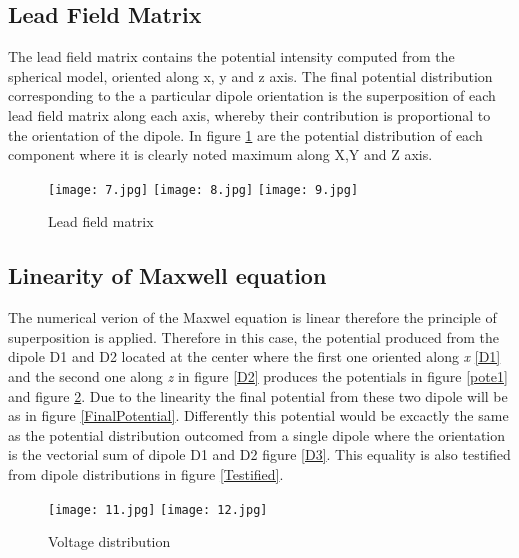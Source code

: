 \newpage
\subsection{Lead Field Matrix}

The lead field matrix contains the potential intensity computed from the spherical model, oriented along x, y and z axis. The final potential distribution corresponding to the a particular dipole orientation is the superposition of each lead field matrix along each axis, whereby their contribution is proportional to the orientation of the dipole. 
In figure \ref{LFM} are the potential distribution of each component where it is clearly noted maximum along X,Y and Z axis. 

\begin{figure}[!htbp]
%
    \centering
\texttt{[image: 7.jpg]}
\endminipage\hfill
{}%
    \centering
\texttt{[image: 8.jpg]}
\endminipage\hfill
{}%
    \centering
\texttt{[image: 9.jpg]}
\endminipage\hfill
\caption{Lead field matrix}\label{LFM}
\end{figure}


\newpage
\subsection{Linearity of Maxwell equation}

The numerical verion of the Maxwel equation is linear therefore the principle of superposition is applied. Therefore in this case, the potential produced from the dipole D1 and D2 located at the center where the first one oriented along \textit{x} \ref{D1} and the second one along \textit{z} in figure \ref{D2} produces the potentials in figure \ref{pote1} and figure \ref{pote2}. Due to the linearity the final potential from these two dipole will be as in figure \ref{FinalPotential}. Differently this potential would be excactly the same as the potential distribution outcomed from a single dipole where the orientation is the vectorial sum of dipole D1 and D2 figure \ref{D3}. This equality is also testified from dipole distributions in figure \ref{Testified}.


\begin{figure}[!htbp]
%
    \centering
    \texttt{[image: 11.jpg]}
    \label{pote1}
\endminipage\hfill
{}%
    \centering
    \texttt{[image: 12.jpg]}
    \label{pote2}
\endminipage\hfill
\caption{Voltage distribution}
\end{figure}



